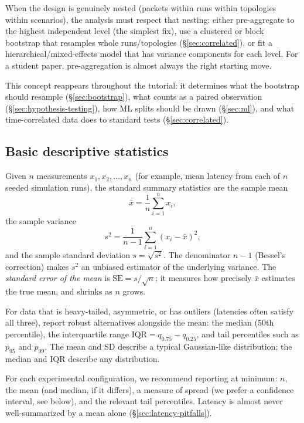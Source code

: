 \documentclass[11pt]{article}
\begin{document}
When the design is genuinely nested (packets within runs within topologies within scenarios), the analysis must respect that nesting: either pre-aggregate to the highest independent level (the simplest fix), use a clustered or block bootstrap that resamples whole runs/topologies (\S\ref{sec:correlated}), or fit a hierarchical/mixed-effects model that has variance components for each level. For a student paper, pre-aggregation is almost always the right starting move.

This concept reappears throughout the tutorial: it determines what the bootstrap should resample (\S\ref{sec:bootstrap}), what counts as a paired observation (\S\ref{sec:hypothesis-testing}), how ML splits should be drawn (\S\ref{sec:ml}), and what time-correlated data does to standard tests (\S\ref{sec:correlated}).

\subsection{Basic descriptive statistics}
\label{sec:descriptive}

Given $n$ measurements $x_1, x_2, \ldots, x_n$ (for example, mean latency from each of $n$ seeded simulation runs), the standard summary statistics are the sample mean
\begin{equation}
\bar{x} = \frac{1}{n} \sum_{i=1}^{n} x_i,
\end{equation}
the sample variance
\begin{equation}
s^2 = \frac{1}{n-1} \sum_{i=1}^{n} (x_i - \bar{x})^2,
\end{equation}
and the sample standard deviation $s = \sqrt{s^2}$. The denominator $n-1$ (Bessel's correction) makes $s^2$ an unbiased estimator of the underlying variance. The \emph{standard error of the mean} is $\mathrm{SE} = s / \sqrt{n}$; it measures how precisely $\bar{x}$ estimates the true mean, and shrinks as $n$ grows.

For data that is heavy-tailed, asymmetric, or has outliers (latencies often satisfy all three), report robust alternatives alongside the mean: the median (50th percentile), the interquartile range $\mathrm{IQR} = q_{0.75} - q_{0.25}$, and tail percentiles such as $p_{95}$ and $p_{99}$. The mean and SD describe a typical Gaussian-like distribution; the median and IQR describe any distribution.

For each experimental configuration, we recommend reporting at minimum: $n$, the mean (and median, if it differs), a measure of spread (we prefer a confidence interval, see below), and the relevant tail percentiles. Latency is almost never well-summarized by a mean alone (\S\ref{sec:latency-pitfalls}).
\end{document}
